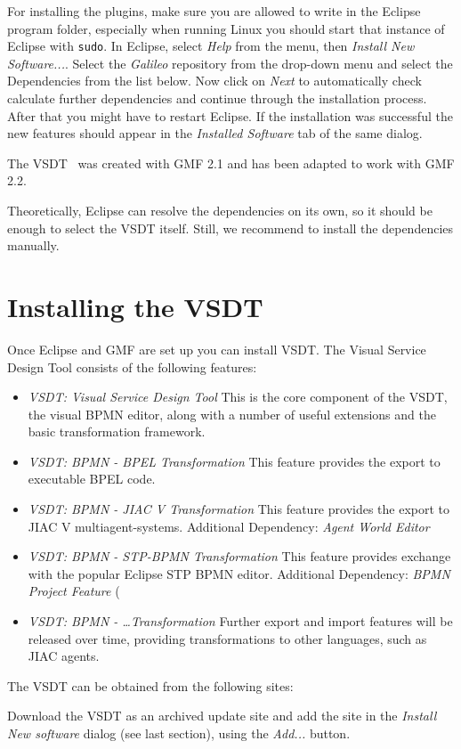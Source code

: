 For installing the plugins, make sure you are allowed to write in the Eclipse program folder, especially when running Linux you should start that instance of Eclipse with \texttt{sudo}.  In Eclipse, select \emph{Help} from the menu, then \emph{Install New Software...}. Select the \emph{Galileo} repository from the drop-down menu and select the Dependencies from the list below. Now click on \emph{Next} to automatically check calculate further dependencies and continue through the installation process. After that you might have to restart Eclipse.  If the installation was successful the new features should appear in the \emph{Installed Software} tab of the same dialog.

The VSDT \version\ was created with GMF 2.1 and has been adapted to work with GMF 2.2.

Theoretically, Eclipse can resolve the dependencies on its own, so it should be enough to select the VSDT itself. Still, we recommend to install the dependencies manually.


\section{Installing the VSDT}
\label{sec:user_setup_vsdt}

Once Eclipse and GMF are set up you can install VSDT.  The Visual Service Design Tool consists of the following features:

\begin{itemize}
	\item \emph{VSDT: Visual Service Design Tool} This is the core component of the VSDT, the visual BPMN editor, along with a number of useful extensions and the basic transformation framework.
	\item \emph{VSDT: BPMN - BPEL Transformation} This feature provides the export to executable BPEL code.
	\item \emph{VSDT: BPMN - JIAC V Transformation} This feature provides the export to JIAC V multiagent-systems. Additional Dependency: \emph{Agent World Editor}
	\item \emph{VSDT: BPMN - STP-BPMN Transformation} This feature provides exchange with the popular Eclipse STP BPMN editor. Additional Dependency: \emph{BPMN Project Feature} (
	\item \emph{VSDT: BPMN - \dots Transformation} Further export and import features will be released over time, providing transformations to other languages, such as JIAC agents.
\end{itemize}

The VSDT can be obtained from the following sites:
\begin{center}
	\downloadsites
\end{center}

Download the VSDT as an archived update site and add the site in the \emph{Install New software} dialog (see last section), using the \emph{Add...} button.

